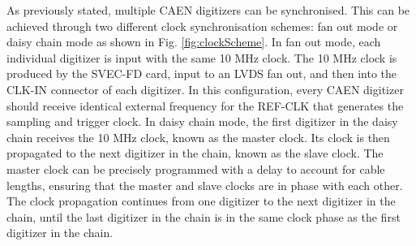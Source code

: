 As previously stated, multiple CAEN digitizers can be synchronised. 
This can be achieved through two different clock synchronisation schemes: fan out mode or daisy chain mode as shown in Fig. \ref{fig:clockScheme}.
In fan out mode, each individual digitizer is input with the same 10 MHz clock.
The 10 MHz clock is produced by the SVEC-FD card, input to an LVDS fan out, and then into the CLK-IN connector of each digitizer.
In this configuration, every CAEN digitizer should receive identical external frequency for the REF-CLK that generates the sampling and trigger clock.
In daisy chain mode, the first digitizer in the daisy chain receives the 10 MHz clock, known as the master clock.
Its clock is then propagated to the next digitizer in the chain, known as the slave clock.
The master clock can be precisely programmed with a delay to account for cable lengths, ensuring that the master and slave clocks are in phase with each other.
The clock propagation continues from one digitizer to the next digitizer in the chain, until the last digitizer in the chain is in the same clock phase as the first digitizer in the chain.  

